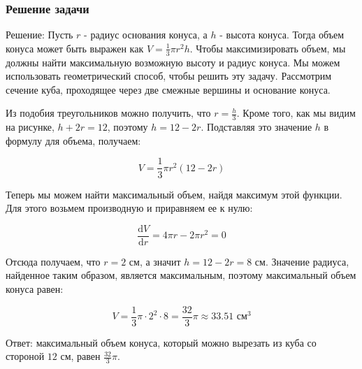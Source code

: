 \begin{frame}[label=task_solution]
\frametitle{Решение задачи }
\tiny
Решение:
Пусть $r$ - радиус основания конуса, а $h$ - высота конуса. Тогда объем конуса может быть выражен как $V=\frac{1}{3}\pi r^2 h$. Чтобы максимизировать объем, мы должны найти максимальную возможную высоту и радиус конуса. Мы можем использовать геометрический способ, чтобы решить эту задачу. Рассмотрим сечение куба, проходящее через две смежные вершины и основание конуса.

Из подобия треугольников можно получить, что $r=\frac{h}{3}$. Кроме того, как мы видим на рисунке, $h+2r=12$, поэтому $h=12-2r$. Подставляя это значение $h$ в формулу для объема, получаем:

$$V=\frac{1}{3}\pi r^2 (12-2r)$$

Теперь мы можем найти максимальный объем, найдя максимум этой функции. Для этого возьмем производную и приравняем ее к нулю:

$$\frac{\mathrm{d} V}{\mathrm{d} r} = 4\pi r - 2\pi r^2 = 0$$

Отсюда получаем, что $r=2$ см, а значит $h=12-2r=8$ см. Значение радиуса, найденное таким образом, является максимальным, поэтому максимальный объем конуса равен:

$$V=\frac{1}{3}\pi \cdot 2^2 \cdot 8 = \frac{32}{3}\pi \approx 33.51 \text{ см}^3$$

Ответ: максимальный объем конуса, который можно вырезать из куба со стороной $12$ см, равен $\frac{32}{3}\pi$.

\hyperlink{example_solution_back}{}
\end{frame}